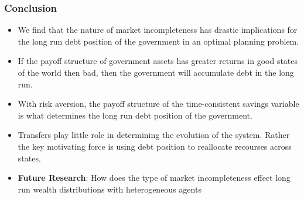 \documentclass{beamer}
\begin{document}
 \begin{frame}
  \frametitle{Conclusion}
\begin{itemize}
	\item We find that the nature of market incompleteness has drastic implications for the long run debt position of the government in an optimal planning problem.
	\item If the payoff structure of government assets has greater returns in good states of the world then bad, then the government will accumulate debt in the long run.
	\item  With risk aversion, the payoff structure of the time-consistent savings variable is what determines the long run debt position of the government.
	\item  Transfers play little role in determining the evolution of the system.  Rather the key motivating force is using debt position to reallocate recourses across states.
	\item  \textbf{Future Research}:  How does the type of market incompleteness effect long run wealth distributions with heterogeneous agents
\end{itemize}
 \end{frame}

 
\end{document}
